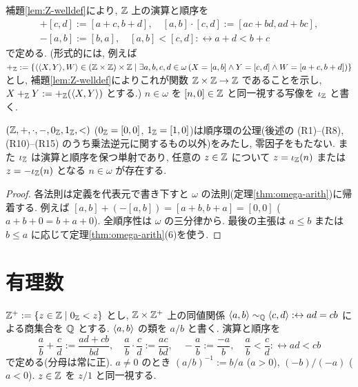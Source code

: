 \begin{dfn}
  補題\ref{lem:Z-welldef}により, $\mathbb{Z}$ 上の演算と順序を
  \begin{gather*}
    [a,b] + [c,d] := [a+c,b+d], \quad [a,b]\cdot[c,d] := [ac+bd, ad+bc], \\
    -[a,b] := [b,a], \quad [a,b] < [c,d] :\leftrightarrow a + d < b + c
  \end{gather*}
  で定める. (形式的には, 例えば $+_{\mathbb{Z}} := \{\langle \langle X,Y\rangle,W\rangle \in (\mathbb{Z}\times\mathbb{Z})\times\mathbb{Z} \mid \exists a,b,c,d \in \omega\,(X = [a,b] \land Y = [c,d] \land W = [a+c,b+d])\}$ とし, 補題\ref{lem:Z-welldef}によりこれが関数 $\mathbb{Z}\times\mathbb{Z} \to \mathbb{Z}$ であることを示し, $X +_{\mathbb{Z}} Y := {+_{\mathbb{Z}}}(\langle X,Y\rangle)$ とする.) $n \in \omega$ を $[n,0] \in \mathbb{Z}$ と同一視する写像を $\iota_{\mathbb{Z}}$ と書く.
\end{dfn}

\begin{thm}\label{thm:Z}
  $(\mathbb{Z}, +, \cdot, -, 0_{\mathbb{Z}}, 1_{\mathbb{Z}}, <)$ ($0_{\mathbb{Z}} = [0,0]$, $1_{\mathbb{Z}} = [1,0]$)は順序環の公理(後述の (R1)--(R8), (R10)--(R15) のうち乗法逆元に関するもの以外)をみたし, 零因子をもたない. また $\iota_{\mathbb{Z}}$ は演算と順序を保つ単射であり, 任意の $z \in \mathbb{Z}$ について $z = \iota_{\mathbb{Z}}(n)$ または $z = -\iota_{\mathbb{Z}}(n)$ となる $n \in \omega$ が存在する.
\end{thm}
\begin{proof}
  各法則は定義を代表元で書き下すと $\omega$ の法則(定理\ref{thm:omega-arith})に帰着する. 例えば $[a,b] + (-[a,b]) = [a+b, b+a] = [0,0]$ ($a+b+0 = b+a+0$). 全順序性は $\omega$ の三分律から. 最後の主張は $a \leq b$ または $b \leq a$ に応じて定理\ref{thm:omega-arith}(6)を使う.
\end{proof}

\section{有理数}

\begin{dfn}
  $\mathbb{Z}^+ := \{z \in \mathbb{Z} \mid 0_{\mathbb{Z}} < z\}$ とし, $\mathbb{Z} \times \mathbb{Z}^+$ 上の同値関係 $\langle a,b\rangle \sim_{\mathbb{Q}} \langle c,d\rangle :\leftrightarrow a d = c b$ による商集合を $\mathbb{Q}$ とする. $\langle a,b\rangle$ の類を $a/b$ と書く. 演算と順序を
  \[ \frac{a}{b} + \frac{c}{d} := \frac{ad + cb}{bd}, \quad \frac{a}{b}\cdot\frac{c}{d} := \frac{ac}{bd}, \quad -\frac{a}{b} := \frac{-a}{b}, \quad \frac{a}{b} < \frac{c}{d} :\leftrightarrow ad < cb \]
  で定める(分母は常に正). $a \neq 0$ のとき $(a/b)^{-1} := b/a$ ($a > 0$), $(-b)/(-a)$ ($a < 0$). $z \in \mathbb{Z}$ を $z/1$ と同一視する.
\end{dfn}

